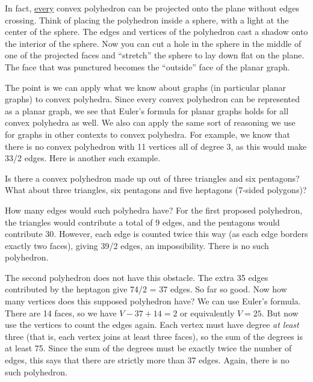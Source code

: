 \documentclass[12pt]{article}
\begin{document}
\begin{center}
\end{center}

In fact, \underline{every} convex polyhedron can be projected onto the plane without edges crossing.  Think of placing the polyhedron inside a sphere, with a light at the center of the sphere.  The edges and vertices of the polyhedron cast a shadow onto the interior of the sphere.  Now you can cut a hole in the sphere in the middle of one of the projected faces and ``stretch'' the sphere to lay down flat on the plane.  The face that was punctured becomes the ``outside'' face of the planar graph.

The point is we can apply what we know about graphs (in particular planar graphs) to convex polyhedra.  Since every convex polyhedron can be represented as a planar graph, we see that Euler's formula for planar graphs holds for all convex polyhedra as well.  We also can apply the same sort of reasoning we use for graphs in other contexts to convex polyhedra.  For example, we know that there is no convex polyhedron with 11 vertices all of degree 3, as this would make 33/2 edges.  Here is another such example.

\begin{example}
Is there a convex polyhedron made up out of three triangles and six pentagons?  What about three triangles, six pentagons and five heptagons (7-sided polygons)?

\begin{solution}
How many edges would such polyhedra have?  For the first proposed polyhedron, the triangles would contribute a total of 9 edges, and the pentagons would contribute 30.  However, each edge is counted twice this way (as each edge borders exactly two faces), giving 39/2 edges, an impossibility.  There is no such polyhedron.

The second polyhedron does not have this obstacle. The extra 35 edges contributed by the heptagon give 74/2 = 37 edges.  So far so good.  Now how many vertices does this supposed polyhedron have?  We can use Euler's formula.  There are 14 faces, so we have $V - 37 + 14 = 2$ or equivalently $V = 25$.  But now use the vertices to count the edges again.  Each vertex must have degree \emph{at least} three (that is, each vertex joins at least three faces), so the sum of the degrees is at least 75.  Since the sum of the degrees must be exactly twice the number of edges, this says that there are strictly more than 37 edges.  Again, there is no such polyhedron.
\end{solution}
\end{example}
\end{document}

